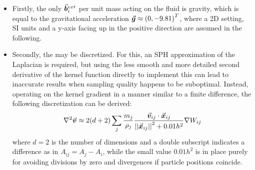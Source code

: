 \begin{itemize}
  \item Firstly, the only  $\vec{\bm{b}}_i^{ext}$ per unit mass acting on the fluid is gravity, which is equal to the gravitational acceleration $\vec{\bm{g}} \approx \left(0, -9.81\right)^T$, where a 2D setting, SI units and a y-axis facing up in the positive direction are assumed in the following.
  \item Secondly, the  may be discretized. For this, an SPH approximation of the Laplacian is required, but using the less smooth and more detailed second derivative of the kernel function directly to implement this can lead to inaccurate results when sampling quality happens to be suboptimal. Instead, operating on the kernel gradient in a manner similar to a finite difference, the following discretization can be derived\autocite*{tutorial}:
        \begin{equation}\label{eq:viscosity-sph}
          \mathop{}\!\mathbin\nabla^2\vec{\bm{v}} \approx 2(d+2)\sum_j  \frac{m_j}{\rho_j} \frac{\vec{\bm{v}}_{ij}\cdot\vec{\bm{x}}_{ij}}{\left|\left|\vec{\bm{x}}_{ij}\right|\right|^2 + 0.01h^2}\nabla W_{ij}
        \end{equation}
        where $d=2$ is the number of dimensions and a double subscript indicates a difference as in $A_{ij} = A_j - A_i$, while the small value $0.01h^2$ is in place purely for avoiding divisions by zero and divergences if particle positions coincide\autocite*{price-2012}.


\end{itemize}
